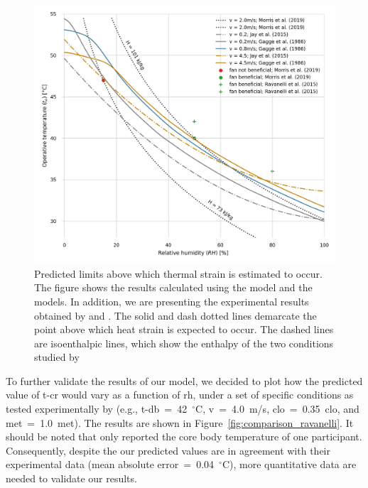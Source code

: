 

\begin{figure}[thb!]
    \centering
    \includegraphics[width=\textwidth]{figures/comparison_air_speed.png}
    \caption{Predicted limits above which thermal strain is estimated to occur.
    The figure shows the results calculated using the  model and the  models.
    In addition, we are presenting the experimental results obtained by  and .
    The solid and dash dotted lines demarcate the point above which heat strain is expected to occur.
    The dashed lines are isoenthalpic lines, which show the enthalpy of the two conditions studied by }
    \label{fig:comparison_air_speed}
\end{figure}

To further validate the results of our model, we decided to plot how the predicted value of \ac{t-cr} would vary as a function of \ac{rh}, under a set of specific conditions as tested experimentally by  (e.g., \ac{t-db}~=~42~$^{\circ}$C, \ac{v}~=~4.0~m/s, \ac{clo}~=~0.35~clo, and \ac{met}~=~1.0~met).
The results are shown in Figure~\ref{fig:comparison_ravanelli}.
It should be noted that  only reported the core body temperature of one participant.
Consequently, despite the our predicted values are in agreement with their experimental data (mean absolute error~=~0.04~$^{\circ}$C), more quantitative data are needed to validate our results.

